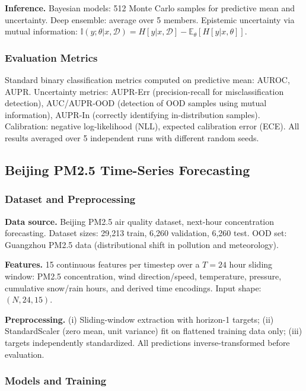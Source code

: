 \documentclass{article}
\theoremstyle{plain}
\theoremstyle{definition}
\theoremstyle{remark}
\begin{document}
\textbf{Inference.} Bayesian models: 512 Monte Carlo samples for predictive mean and uncertainty. Deep ensemble: average over 5 members. Epistemic uncertainty via mutual information: $\mathbb{I}(y;\theta|x,\mathcal{D}) = H[y|x,\mathcal{D}] - \mathbb{E}_\theta[H[y|x,\theta]]$.

\subsubsection{Evaluation Metrics}

Standard binary classification metrics computed on predictive mean: AUROC, AUPR. Uncertainty metrics: AUPR-Err (precision-recall for misclassification detection), AUC/AUPR-OOD (detection of OOD samples using mutual information), AUPR-In (correctly identifying in-distribution samples). Calibration: negative log-likelihood (NLL), expected calibration error (ECE). All results averaged over 5 independent runs with different random seeds.
\subsection{Beijing PM2.5 Time-Series Forecasting}
\label{app:exp:lstm}

\subsubsection{Dataset and Preprocessing}

\textbf{Data source.} Beijing PM2.5 air quality dataset, next-hour concentration forecasting. Dataset sizes: 29{,}213 train, 6{,}260 validation, 6{,}260 test. OOD set: Guangzhou PM2.5 data (distributional shift in pollution and meteorology).

\textbf{Features.} 15 continuous features per timestep over a $T{=}24$ hour sliding window: PM2.5 concentration, wind direction/speed, temperature, pressure, cumulative snow/rain hours, and derived time encodings. Input shape: $(N, 24, 15)$.

\textbf{Preprocessing.} (i) Sliding-window extraction with horizon-1 targets; (ii) StandardScaler (zero mean, unit variance) fit on flattened training data only; (iii) targets independently standardized. All predictions inverse-transformed before evaluation.

\subsubsection{Models and Training}
\end{document}
